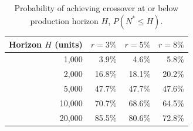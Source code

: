 \begin{table}[htbp]
\centering
\caption{Probability of achieving crossover at or below production horizon $H$, $P(N^* \leq H)$.}
\label{tab:convergence}
\small
\begin{tabular}{@{}rrrr@{}}
\toprule
Horizon $H$ (units) & $r = 3\%$ & $r = 5\%$ & $r = 8\%$ \\
\midrule
1{,}000  & 3.9\% & 4.6\% & 5.8\% \\
2{,}000  & 16.8\% & 18.1\% & 20.2\% \\
5{,}000  & 47.7\% & 47.7\% & 47.6\% \\
10{,}000 & 70.7\% & 68.6\% & 64.5\% \\
20{,}000 & 85.5\% & 80.6\% & 72.8\% \\
\bottomrule
\end{tabular}
\end{table}
